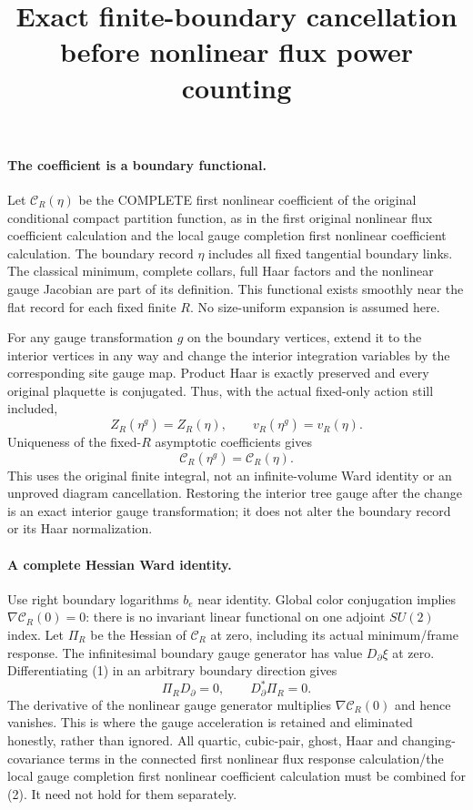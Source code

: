 \documentclass[11pt]{article}
\title{Exact finite-boundary cancellation before nonlinear flux power counting}\author{}\date{}
\begin{document}
\maketitle
\paragraph{The coefficient is a boundary functional.}
Let $\mathcal C_R(\eta)$ be the COMPLETE first nonlinear coefficient of
the original conditional compact partition function, as in the first original nonlinear flux coefficient calculation and the local gauge completion first nonlinear coefficient calculation.
The boundary record $\eta$ includes all fixed tangential boundary links.
The classical minimum, complete collars, full Haar factors and the
nonlinear gauge Jacobian are part of its definition. This functional
exists smoothly near the flat record for each fixed finite $R$.
No size-uniform expansion is assumed here.

For any gauge transformation $g$ on the boundary vertices, extend it to
the interior vertices in any way and change the interior integration
variables by the corresponding site gauge map. Product Haar is exactly
preserved and every original plaquette is conjugated. Thus, with the
actual fixed-only action still included,
\[
 Z_R(\eta^g)=Z_R(\eta),\qquad v_R(\eta^g)=v_R(\eta).
\]
Uniqueness of the fixed-$R$ asymptotic coefficients gives
\[
 \mathcal C_R(\eta^g)=\mathcal C_R(\eta).                           \tag{1}
\]
This uses the original finite integral, not an infinite-volume Ward
identity or an unproved diagram cancellation. Restoring the interior
tree gauge after the change is an exact interior gauge transformation;
it does not alter the boundary record or its Haar normalization.

\paragraph{A complete Hessian Ward identity.}
Use right boundary logarithms $b_e$ near identity. Global color
conjugation implies $\nabla\mathcal C_R(0)=0$: there is no invariant
linear functional on one adjoint $SU(2)$ index. Let $\Pi_R$ be the Hessian
of $\mathcal C_R$ at zero, including its actual minimum/frame response.
The infinitesimal boundary gauge generator has value $D_\partial\xi$
at zero. Differentiating (1) in an arbitrary boundary direction gives
\[
 \boxed{\quad \Pi_R D_\partial=0,\qquad
                D_\partial^*\Pi_R=0.\quad}                       \tag{2}
\]
The derivative of the nonlinear gauge generator multiplies
$\nabla\mathcal C_R(0)$ and hence vanishes. This is where the gauge
acceleration is retained and eliminated honestly, rather than ignored.
All quartic, cubic-pair, ghost, Haar and changing-covariance terms in
the connected first nonlinear flux response calculation/the local gauge completion first nonlinear coefficient calculation must be combined for (2). It need not hold for them
separately.
\end{document}
